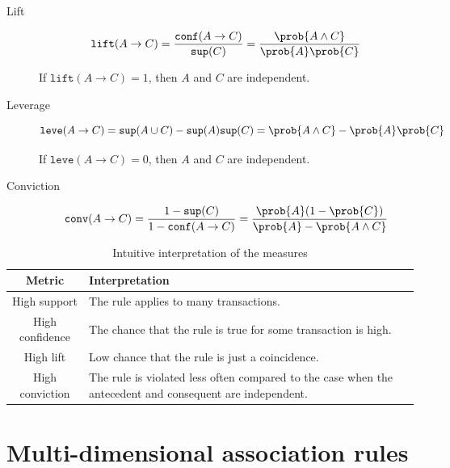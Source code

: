 \begin{description}
    \item[Lift] 
        \[ \texttt{lift}(A \rightarrow C) = \frac{\texttt{conf}(A \rightarrow C)}{\texttt{sup}(C)} = \frac{\prob{A \land C}}{\prob{A}\prob{C}} \]

        If $\texttt{lift}(A \rightarrow C) = 1$, then $A$ and $C$ are independent.
    
    \item[Leverage] 
        \[ \texttt{leve}(A \rightarrow C) = \texttt{sup}(A \cup C) - \texttt{sup}(A)\texttt{sup}(C) = \prob{A \land C} - \prob{A}\prob{C} \]
        
        If $\texttt{leve}(A \rightarrow C) = 0$, then $A$ and $C$ are independent.
    
    \item[Conviction] 
        \[ \texttt{conv}(A \rightarrow C) = \frac{1 - \texttt{sup}(C)}{1 - \texttt{conf}(A \rightarrow C)} = \frac{\prob{A}(1-\prob{C})}{\prob{A}-\prob{A \land C}} \]
\end{description}

\begin{table}[H]
    \centering
    \begin{tabular}{c|p{10cm}}
        \hline
        \textbf{Metric} & \textbf{Interpretation} \\
        \hline
        High support        & The rule applies to many transactions. \\
        \hline
        High confidence     & The chance that the rule is true for some transaction is high. \\
        \hline
        High lift           & Low chance that the rule is just a coincidence. \\
        \hline
        High conviction     & The rule is violated less often compared to the case when the antecedent and consequent are independent. \\
        \hline
    \end{tabular}
    \caption{Intuitive interpretation of the measures}
\end{table}



\section{Multi-dimensional association rules}

